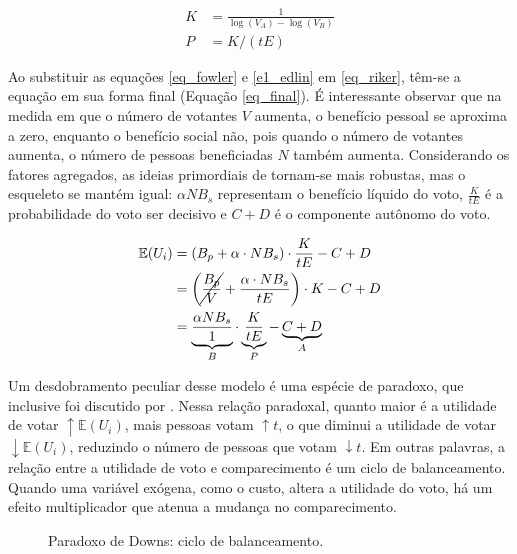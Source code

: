\begin{equation}
\label{e1_edlin}
\begin{aligned}
    K &= \frac{1}{\log(V_A)-\log(V_B)}\\
    P &= K/(tE)
\end{aligned}
\end{equation}

Ao substituir as equações \ref{eq_fowler} e \ref{e1_edlin} em \ref{eq_riker}, têm-se a equação em sua forma final (Equação \ref{eq_final}). É interessante observar que na medida em que o número de votantes $V$ aumenta, o benefício pessoal se aproxima a zero, enquanto o benefício social não, pois quando o número de votantes aumenta, o número de pessoas beneficiadas $N$ também aumenta. Considerando os fatores agregados, as ideias primordiais de \textcite{downs1957economic} tornam-se mais robustas, mas o esqueleto se mantém igual: $\alpha NB_s$ representam o benefício líquido do voto, $\frac{K}{tE}$ é a probabilidade do voto ser decisivo e $C+D$ é o componente autônomo do voto.

\begin{equation}
\label{eq_final}
\begin{aligned}
    \mathbb{E}(U_i)&=(B_p + \alpha\cdot NB_s)\cdot \frac{K}{tE}-C+D\\
    &=\left(\cancel{\frac{B_p}{V}} + \frac{\alpha\cdot NB_s}{tE}\right)\cdot K-C+D\\
    &=\underbrace{\frac{\alpha NB_s}{1}}_B\cdot\underbrace{\frac{K}{tE}}_P-\underbrace{C+D}_A
\end{aligned}
\end{equation}

Um desdobramento peculiar desse modelo é uma espécie de paradoxo, que inclusive foi discutido por \textcite{downs1957economic}. Nessa relação paradoxal, quanto maior é a utilidade de votar $\uparrow\mathbb{E}(U_i)$, mais pessoas votam $\uparrow t$, o que diminui a utilidade de votar $\downarrow\mathbb{E}(U_i)$, reduzindo o número de pessoas que votam $\downarrow t$. Em outras palavras, a relação entre a utilidade de voto e comparecimento é um ciclo de balanceamento. Quando uma variável exógena, como o custo, altera a utilidade do voto, há um efeito multiplicador que atenua a mudança no comparecimento. 

\begin{figure}
    \centering
    
    \caption{Paradoxo de Downs: ciclo de balanceamento.}
    \label{cycle}
\end{figure}

